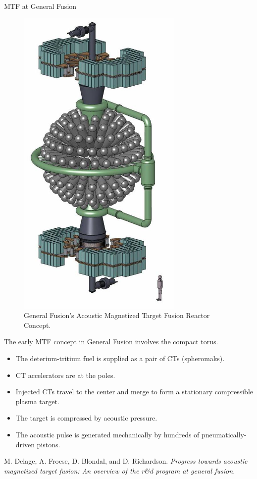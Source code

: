 \begin{frame}[t] {MTF at General Fusion}
    \begin{figure}
        \includegraphics[height=0.6\textheight]{figures/mtf-at-general-fusion.png}
        \caption{General Fusion's Acoustic Magnetized Target Fusion Reactor Concept. \cite{delage_2012_progress}}
        \label{fig:mtf-at-general-fusion}
    \end{figure}

    The early MTF concept in General Fusion involves the compact torus.
    \begin{itemize}
        \item The deterium-tritium fuel is supplied as a pair of CTs (spheromaks).
        \item CT accelerators are at the poles.
        \item Injected CTs travel to the center and merge to form a stationary compressible plasma target.
        \item The target is compressed by acoustic pressure.
        \item The acoustic pulse is generated mechanically by hundreds of pneumatically-driven pistons.
    \end{itemize}

    \tiny \cite{delage_2012_progress}  M. Delage, A. Froese, D. Blondal, and D. Richardson. \textit{Progress towards acoustic magnetized target fusion: An overview of the r\&d program at general fusion.}
\end{frame}